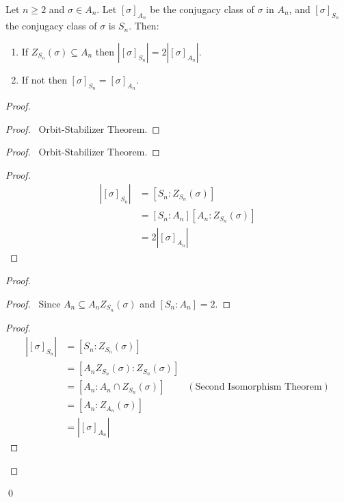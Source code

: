 \begin{prop}
\label{prop:size-of-sigma-An}
Let $n \geq 2$ and $\sigma \in A_n$. Let $[\sigma]_{A_n}$ be the conjugacy class of $\sigma$ in $A_n$, and $[\sigma]_{S_n}$ the conjugacy class of $\sigma$ is $S_n$. Then:
\begin{enumerate}
\item If $Z_{S_n}(\sigma) \subseteq A_n$ then $|[\sigma]_{S_n}| = 2 |[\sigma]_{A_n}|$.
\item If not then $[\sigma]_{S_n} = [\sigma]_{A_n}$.
\end{enumerate}
\end{prop}

\begin{proof}
\pf
{}
\begin{proof}
	\pf\ Orbit-Stabilizer Theorem.
\end{proof}
\begin{proof}
	\pf\ Orbit-Stabilizer Theorem.
\end{proof}
\begin{proof}
	\pf
	\begin{align*}
		|[\sigma]_{S_n}| & = [S_n : Z_{S_n}(\sigma)] \\
		& = [S_n : A_n][A_n : Z_{S_n}(\sigma)] \\
		& = 2|[\sigma]_{A_n}|
	\end{align*}
\end{proof}
\begin{proof}
	\begin{proof}
		\pf\ Since $A_n \subseteq A_n Z_{S_n}(\sigma)$ and $[S_n : A_n] = 2$.
	\end{proof}
	\begin{proof}
		\pf
		\begin{align*}
			|[\sigma]_{S_n}| & = [S_n : Z_{S_n}(\sigma)] \\
			& = [A_n Z_{S_n}(\sigma) : Z_{S_n}(\sigma)] \\
			& = [A_n : A_n \cap Z_{S_n}(\sigma)] & (\text{Second Isomorphism Theorem}) \\
			& = [A_n : Z_{A_n}(\sigma)] \\
			& = |[\sigma]_{A_n}|
		\end{align*}
	\end{proof}
\end{proof}
\qed
\end{proof}

